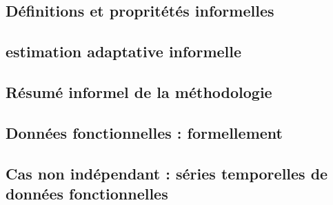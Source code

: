 
\subsection{Définitions et propritétés informelles}
\label{sec:informel}


\subsection{estimation adaptative informelle}

\pagebreak

\subsection{Résumé informel de la méthodologie}

\pagebreak

\subsection{Données fonctionnelles : formellement}

\pagebreak

\subsection{Cas non indépendant : séries temporelles de données fonctionnelles}

\pagebreak